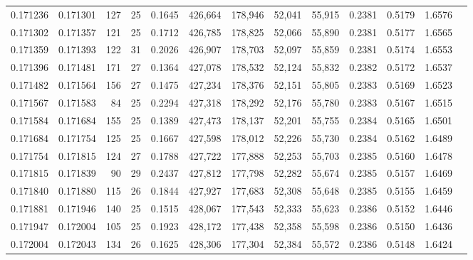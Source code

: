 \begin{tabular}{rrrrrrrrrrrrr}
0.171236 & 0.171301 & 127 &  25 &                                     0.1645 & 426,664 & 178,946 &  52,041 &  55,915 & 0.2381 & 0.5179 & 1.6576 \\
0.171302 & 0.171357 & 121 &  25 &                                     0.1712 & 426,785 & 178,825 &  52,066 &  55,890 & 0.2381 & 0.5177 & 1.6565 \\
0.171359 & 0.171393 & 122 &  31 &                                     0.2026 & 426,907 & 178,703 &  52,097 &  55,859 & 0.2381 & 0.5174 & 1.6553 \\
0.171396 & 0.171481 & 171 &  27 &                                     0.1364 & 427,078 & 178,532 &  52,124 &  55,832 & 0.2382 & 0.5172 & 1.6537 \\
0.171482 & 0.171564 & 156 &  27 &                                     0.1475 & 427,234 & 178,376 &  52,151 &  55,805 & 0.2383 & 0.5169 & 1.6523 \\
0.171567 & 0.171583 &  84 &  25 &                                     0.2294 & 427,318 & 178,292 &  52,176 &  55,780 & 0.2383 & 0.5167 & 1.6515 \\
0.171584 & 0.171684 & 155 &  25 &                                     0.1389 & 427,473 & 178,137 &  52,201 &  55,755 & 0.2384 & 0.5165 & 1.6501 \\
0.171684 & 0.171754 & 125 &  25 &                                     0.1667 & 427,598 & 178,012 &  52,226 &  55,730 & 0.2384 & 0.5162 & 1.6489 \\
0.171754 & 0.171815 & 124 &  27 &                                     0.1788 & 427,722 & 177,888 &  52,253 &  55,703 & 0.2385 & 0.5160 & 1.6478 \\
0.171815 & 0.171839 &  90 &  29 &                                     0.2437 & 427,812 & 177,798 &  52,282 &  55,674 & 0.2385 & 0.5157 & 1.6469 \\
0.171840 & 0.171880 & 115 &  26 &                                     0.1844 & 427,927 & 177,683 &  52,308 &  55,648 & 0.2385 & 0.5155 & 1.6459 \\
0.171881 & 0.171946 & 140 &  25 &                                     0.1515 & 428,067 & 177,543 &  52,333 &  55,623 & 0.2386 & 0.5152 & 1.6446 \\
0.171947 & 0.172004 & 105 &  25 &                                     0.1923 & 428,172 & 177,438 &  52,358 &  55,598 & 0.2386 & 0.5150 & 1.6436 \\
0.172004 & 0.172043 & 134 &  26 &                                     0.1625 & 428,306 & 177,304 &  52,384 &  55,572 & 0.2386 & 0.5148 & 1.6424 \\

\end{tabular}
